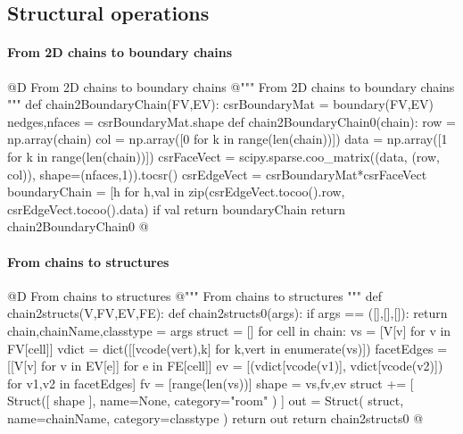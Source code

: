 \documentclass[11pt,oneside]{article}    %
\begin{document}
\subsection{Structural operations}

\paragraph{From 2D chains to boundary chains}
@D From 2D chains to boundary chains
@{""" From 2D chains to boundary chains """
def chain2BoundaryChain(FV,EV):
    csrBoundaryMat = boundary(FV,EV)
    nedges,nfaces = csrBoundaryMat.shape   
    def chain2BoundaryChain0(chain):
        row = np.array(chain)
        col = np.array([0 for k in range(len(chain))])
        data = np.array([1 for k in range(len(chain))])
        csrFaceVect = scipy.sparse.coo_matrix((data, (row, col)), shape=(nfaces,1)).tocsr()
        csrEdgeVect = csrBoundaryMat*csrFaceVect
        boundaryChain = [h for h,val in 
            zip(csrEdgeVect.tocoo().row, csrEdgeVect.tocoo().data) if val%
        return boundaryChain
    return chain2BoundaryChain0
@}

\paragraph{From chains to structures}
@D From chains to structures
@{""" From chains to structures """
def chain2structs(V,FV,EV,FE):
    def chain2structs0(args): 
        if args == ([],[],[]): return
        chain,chainName,classtype = args
        struct = []
        for cell in chain:
            vs = [V[v] for v in FV[cell]]
            vdict = dict([[vcode(vert),k] for k,vert in enumerate(vs)])
            facetEdges = [[V[v] for v in EV[e]] for e in FE[cell]]
            ev = [(vdict[vcode(v1)], vdict[vcode(v2)]) for v1,v2 in facetEdges]
            fv = [range(len(vs))]
            shape = vs,fv,ev
            struct += [ Struct([ shape ], name=None, category="room" ) ]
        out = Struct( struct, name=chainName, category=classtype )
        return out
    return chain2structs0
@}
\end{document}
